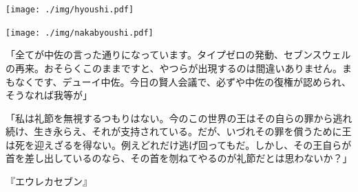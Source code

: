 ﻿\documentclass[9pt,b5paper,tombo,openany]{jsbook}
\begin{document}
\enlargethispage{\paperwidth}
\thispagestyle{empty}
\vspace*{-1truein}
\vspace*{-\topmargin}
\vspace*{-1.15\headheight}
\vspace*{-\headsep}
\vspace*{-\topskip}
\noindent\hspace*{-1.16in}\hspace*{-\oddsidemargin}
\texttt{[image: ./img/hyoushi.pdf]}

\mbox{}
\newpage
\thispagestyle{empty}

\mbox{}
\newpage
\thispagestyle{empty}

\newpage
\enlargethispage{\paperwidth}
\thispagestyle{empty}
\vspace*{-1truein}
\vspace*{-\topmargin}
\vspace*{-1.15\headheight}
\vspace*{-\headsep}
\vspace*{-\topskip}
\noindent\hspace*{-1.16in}\hspace*{-\oddsidemargin}
\texttt{[image: ./img/nakabyoushi.pdf]}

\tableofcontents
\thispagestyle{empty}

\newpage
\thispagestyle{empty}
\begin{center}
\begin{minipage}{0.3\hsize}
\begin{tiny}
「全てが中佐の言った通りになっています。タイプゼロの発動、セブンスウェルの再来。おそらくこのままですと、やつらが出現するのは間違いありません。まもなくです、デューイ中佐。今日の賢人会議で、必ずや中佐の復権が認められ、そうなれば我等が」

「私は礼節を無視するつもりはない。今のこの世界の王はその自らの罪から逃れ続け、生き永らえ、それが支持されている。だが、いづれその罪を償うために王は死を迎えざるを得ない。例えどれだけ逃げ回ってもだ。しかし、その王自らが首を差し出しているのなら、その首を刎ねてやるのが礼節だとは思わないか？」
\begin{flushright}
『エウレカセブン』
\end{flushright}
\end{tiny}
\end{minipage}
\end{center}
\end{document}
